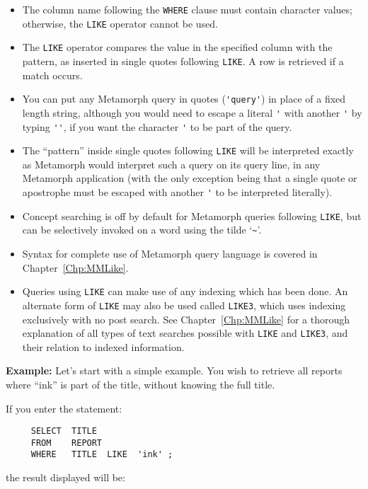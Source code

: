 \begin{itemize}
\item The column name following the \verb`WHERE` clause must contain
character values; otherwise, the \verb`LIKE` operator cannot be used.

\item The \verb`LIKE` operator compares the value in the specified column
with the pattern, as inserted in single quotes following \verb`LIKE`.  A row
is retrieved if a match occurs.

\item You can put any Metamorph query in quotes (\verb`'query'`) in
place of a fixed length string, although you would need to escape a
literal \verb`'` with another \verb`'` by typing \verb`''`, if you
want the character \verb`'` to be part of the query.

\item The ``pattern'' inside single quotes following \verb`LIKE` will be
interpreted exactly as Metamorph would interpret such a query on its
query line, in any Metamorph application (with the only exception
being that a single quote or apostrophe must be escaped with
another \verb`'` to be interpreted literally).

\item Concept searching is off by default for Metamorph queries
following \verb`LIKE`, but can be selectively invoked on a word using the
tilde `\verb`~`'.

\item Syntax for complete use of Metamorph query language is covered
in Chapter~\ref{Chp:MMLike}.

\item Queries using \verb`LIKE` can make use of any indexing which has been
done.  An alternate form of \verb`LIKE` may also be used called \verb`LIKE3`, which
uses indexing exclusively with no post search.  See
Chapter~\ref{Chp:MMLike} for a thorough explanation of all types of
text searches possible with \verb`LIKE` and \verb`LIKE3`, and their relation to
indexed information.
\end{itemize}

{\bf Example:}
Let's start with a simple example.  You wish to retrieve all reports
where ``ink'' is part of the title, without knowing the full title.

If you enter the statement:
\begin{verbatim}
     SELECT  TITLE
     FROM    REPORT
     WHERE   TITLE  LIKE  'ink' ;
\end{verbatim}
the result displayed will be:


